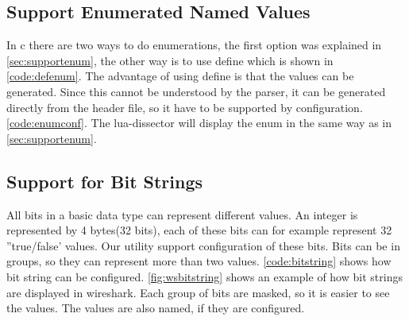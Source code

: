 \subsection{Support Enumerated Named Values}
In \Gls{c} there are two ways to do enumerations, the first option was explained in 
\autoref{sec:supportenum}, the other way is to use \gls{define} which is shown in 
\autoref{code:defenum}. The advantage of using \gls{define} is that the values 
can be generated. Since this cannot be understood by the \gls{parser}, it can be 
generated directly from the \gls{header} file, so it have to be supported by 
configuration. \autoref{code:enumconf}. The \Gls{lua}-\gls{dissector} will display the 
\gls{enum} in the same way as in \autoref{sec:supportenum}.





\subsection{Support for Bit Strings}
All bits in a basic data type can represent different values. An \gls{integer} is 
represented by 4 bytes(32 bits), each of these bits can for example represent 
32 ''true/false' values. Our \gls{utility} support configuration of these bits. Bits 
can be in groups, so they can represent more than two values. 
\autoref{code:bitstring} shows how \gls{bit string} can be configured. 
\autoref{fig:wsbitstring} shows an example of how \glspl{bit string} are displayed in 
\Gls{wireshark}. Each group of bits are masked, so it is easier to see the values. 
The values are also named, if they are configured.


